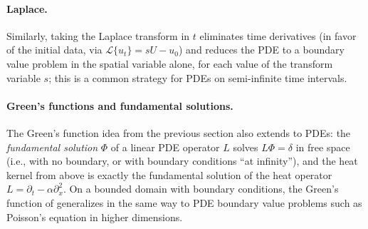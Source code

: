 \paragraph{Laplace.}
Similarly, taking the Laplace transform in $t$ eliminates time
derivatives (in favor of the initial data, via $\mathcal{L}\{u_t\} = sU
- u_0$) and reduces the PDE to a boundary value problem in the spatial
variable alone, for each value of the transform variable $s$; this is
a common strategy for PDEs on semi-infinite time intervals.

\paragraph{Green's functions and fundamental solutions.}
The Green's function idea from the previous section also extends to
PDEs: the \emph{fundamental solution} $\Phi$ of a linear PDE operator
$L$ solves $L\Phi = \delta$ in free space (i.e., with no boundary, or
with boundary conditions ``at infinity''), and the heat kernel from
above is exactly the fundamental solution of the heat operator $L =
\partial_t - \alpha \partial_x^2$. On a bounded domain with boundary
conditions, the Green's function of
 generalizes in the same way to PDE
boundary value problems such as Poisson's equation in higher
dimensions.


